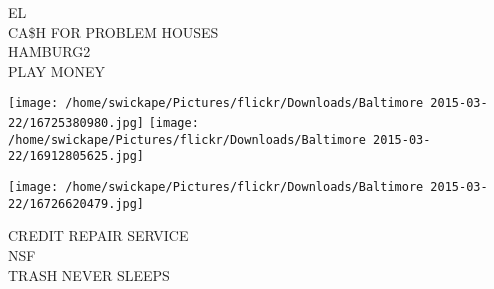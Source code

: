 \documentclass[10pt,letterpaper]{article}
\begin{document}
EL\\
CA\$H FOR PROBLEM HOUSES\\
HAMBURG2\\
PLAY MONEY\\
\pagebreak

\texttt{[image: /home/swickape/Pictures/flickr/Downloads/Baltimore 2015-03-22/16725380980.jpg]}
\texttt{[image: /home/swickape/Pictures/flickr/Downloads/Baltimore 2015-03-22/16912805625.jpg]}

\vspace{0.25in}
\texttt{[image: /home/swickape/Pictures/flickr/Downloads/Baltimore 2015-03-22/16726620479.jpg]}

CREDIT REPAIR SERVICE\\
NSF\\
TRASH NEVER SLEEPS\\
\pagebreak
\end{document}
